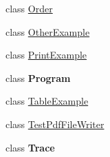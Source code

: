 \begin{DoxyCompactItemize}
class \hyperlink{class_test_pdf_file_writer_1_1_order}{Order}
\item 
class \hyperlink{class_test_pdf_file_writer_1_1_other_example}{Other\+Example}
\item 
class \hyperlink{class_test_pdf_file_writer_1_1_print_example}{Print\+Example}
\item 
class {\bfseries Program}
\item 
class \hyperlink{class_test_pdf_file_writer_1_1_table_example}{Table\+Example}
\item 
class \hyperlink{class_test_pdf_file_writer_1_1_test_pdf_file_writer}{Test\+Pdf\+File\+Writer}
\item 
class {\bfseries Trace}
\end{DoxyCompactItemize}
